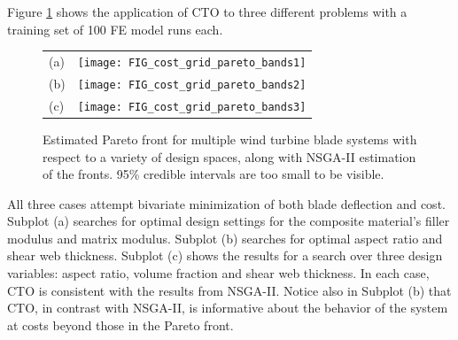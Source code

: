 \documentclass[twocolumn,10pt]{asme2ej}
\begin{document}
%
Figure \ref{fig:more_pfs} shows the application of CTO to three different problems with a training set of 100 FE model runs each. 
%
\begin{figure}[h]
	\begin{tabular}{m{.3cm}m{2cm}}
	     (a)&\texttt{[image: FIG\_cost\_grid\_pareto\_bands1]}  \\
	     (b)&\texttt{[image: FIG\_cost\_grid\_pareto\_bands2]}\\
	     (c)&\texttt{[image: FIG\_cost\_grid\_pareto\_bands3]}
	\end{tabular}
	\caption{Estimated Pareto front for multiple wind turbine blade systems with respect to a variety of design spaces, along with NSGA-II estimation of the fronts. 95\% credible intervals are too small to be visible.}
	\label{fig:more_pfs}
\end{figure}
%
All three cases attempt bivariate minimization of both blade deflection and cost.
%
Subplot (a) searches for optimal design settings for the composite material's filler modulus and matrix modulus.
%
Subplot (b) searches for optimal aspect ratio and shear web thickness.
%
Subplot (c) shows the results for a search over three design variables: aspect ratio, volume fraction and shear web thickness.
%
In each case, CTO is consistent with the results from NSGA-II.
%
%
Notice also in Subplot (b) that CTO, in contrast with NSGA-II, is informative about the behavior of the system at costs beyond those in the Pareto front.
%

%
%
\end{document}
